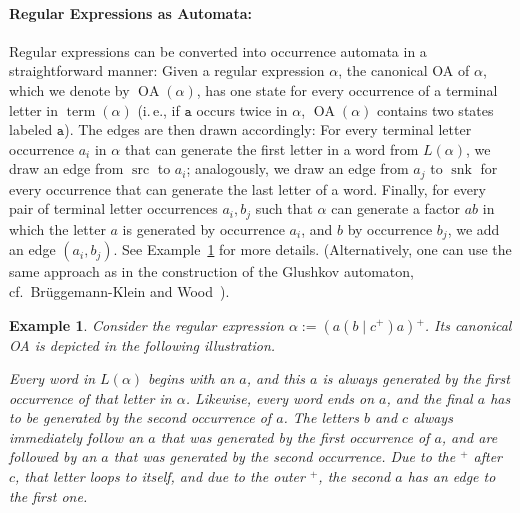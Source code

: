 \documentclass[a4paper,11pt, svgnames,titlepage]{article}
\newcommand{\rxp}{{^\mathtt{+}}}
\DeclareMathOperator{\ror}{\mathtt{|}}
\newcommand{\df}{:=}
\DeclareMathOperator{\src}{src}
\DeclareMathOperator{\snk}{snk}
\DeclareMathOperator{\OA}{OA}
\DeclareMathOperator{\term}{term}
\newtheorem{example}{Example}
\begin{document}
\paragraph{Regular Expressions as Automata:} Regular expressions can be converted into occurrence automata in a straightforward manner: Given a regular expression $\alpha$, the canonical OA of $\alpha$, which we denote by $\OA(\alpha)$, has one state for every occurrence of a terminal letter in $\term(\alpha)$ (i.\,e., if $\mathtt{a}$ occurs twice in $\alpha$, $\OA(\alpha)$ contains two states labeled $\mathtt{a}$). The edges are then drawn accordingly: For every terminal letter occurrence $a_i$ in $\alpha$ that can generate the first letter in a word from $L(\alpha)$, we draw an edge from $\src$ to $a_i$; analogously, we draw an edge from $a_j$ to $\snk$ for every occurrence that can generate the last letter of a word. Finally, for every pair of terminal letter occurrences $a_i,b_j$ such that $\alpha$ can generate a factor $ab$ in which the letter $a$ is generated by occurrence $a_i$, and $b$ by occurrence $b_j$, we add an edge $(a_i,b_j)$. See Example~\ref{ex:oa} for more details. (Alternatively, one can use the same approach as in the construction of the Glushkov automaton, cf.\ Brüggemann-Klein and Wood~\cite{bru:one}).

\begin{example}\label{ex:oa}
Consider the regular expression $\alpha\df (a(b\ror c\rxp)a)\rxp$. Its canonical OA is depicted in the following illustration.
\begin{center}
	
\end{center}
Every word in $L(\alpha)$ begins with an $a$, and this $a$ is always generated by the first occurrence of that letter in $\alpha$. Likewise, every word ends on $a$, and the final $a$ has to be generated by the second occurrence of $a$. The letters $b$ and $c$ always immediately follow an $a$ that was generated by the first occurrence of $a$, and are followed by an $a$ that was generated by the second occurrence. Due to the $\rxp$ after $c$, that letter loops to itself, and due to the outer $\rxp$, the second $a$ has an edge to the first one.
\end{example}
\end{document}
